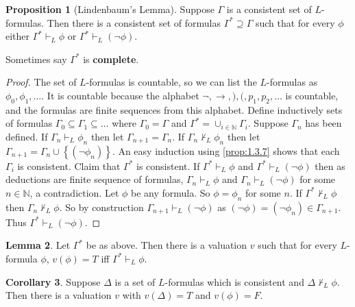 \documentclass{article}
\newcommand{\N}{\mathbb{N}}
\newcommand{\rb}[1]{\left( #1 \right)}
\newcommand{\cb}[1]{\left\{ #1 \right\}}
\newcommand{\notb}[1]{\rb{\neg #1}}
\theoremstyle{definition}\newtheorem{definition}{Definition}[subsection]
\theoremstyle{definition}\newtheorem{remark}[definition]{Remark}
\theoremstyle{definition}\newtheorem*{example}{Example}
\theoremstyle{definition}\newtheorem*{note}{Note}
\newtheorem{proposition}[definition]{Proposition}
\newtheorem{lemma}[definition]{Lemma}
\newtheorem{corollary}[definition]{Corollary}
\begin{document}
\begin{proposition}[Lindenbaum's Lemma]
\label{prop:1.3.8}
Suppose $ \Gamma $ is a consistent set of $ L $-formulas. Then there is a consistent set of formulas $ \Gamma^* \supseteq \Gamma $ such that for every $ \phi $ either $ \Gamma^* \vdash_L \phi $ or $ \Gamma^* \vdash_L \notb{\phi} $.
\end{proposition}

Sometimes say $ \Gamma^* $ is \textbf{complete}.

\begin{proof}
The set of $ L $-formulas is countable, so we can list the $ L $-formulas as $ \phi_0, \phi_1, \dots $. It is countable because the alphabet $ \neg, \rightarrow, ), (, p_1, p_2, \dots $ is countable, and the formulas are finite sequences from this alphabet. Define inductively sets of formulas $ \Gamma_0 \subseteq \Gamma_1 \subseteq \dots $ where $ \Gamma_0 = \Gamma $ and $ \Gamma^* = \cup_{i \in \N} \Gamma_i $. Suppose $ \Gamma_n $ has been defined. If $ \Gamma_n \vdash_L \phi_n $ then let $ \Gamma_{n + 1} = \Gamma_n $. If $ \Gamma_n \not\vdash_L \phi_n $ then let $ \Gamma_{n + 1} = \Gamma_n \cup \cb{\notb{\phi_n}} $. An easy induction using \ref{prop:1.3.7} shows that each $ \Gamma_i $ is consistent. Claim that $ \Gamma^* $ is consistent. If $ \Gamma^* \vdash_L \phi $ and $ \Gamma^* \vdash_L \notb{\phi} $ then as deductions are finite sequence of formulas, $ \Gamma_n \vdash_L \phi $ and $ \Gamma_n \vdash_L \notb{\phi} $ for some $ n \in \N $, a contradiction. Let $ \phi $ be any formula. So $ \phi = \phi_n $ for some $ n $. If $ \Gamma^* \not\vdash_L \phi $ then $ \Gamma_n \not\vdash_L \phi $. So by construction $ \Gamma_{n + 1} \vdash_L \notb{\phi} $ as $ \notb{\phi} = \notb{\phi_n} \in \Gamma_{n + 1} $. Thus $ \Gamma^* \vdash_L \notb{\phi} $.
\end{proof}


\begin{lemma}
\label{lem:1.3.9}
Let $ \Gamma^* $ be as above. Then there is a valuation $ v $ such that for every $ L $-formula $ \phi $, $ v\rb{\phi} = T $ iff $ \Gamma^* \vdash_L \phi $.
\end{lemma}

\begin{corollary}
\label{cor:1.3.10}
Suppose $ \Delta $ is a set of $ L $-formulas which is consistent and $ \Delta \not\vdash_L \phi $. Then there is a valuation $ v $ with $ v\rb{\Delta} = T $ and $ v\rb{\phi} = F $.
\end{corollary}
\end{document}
